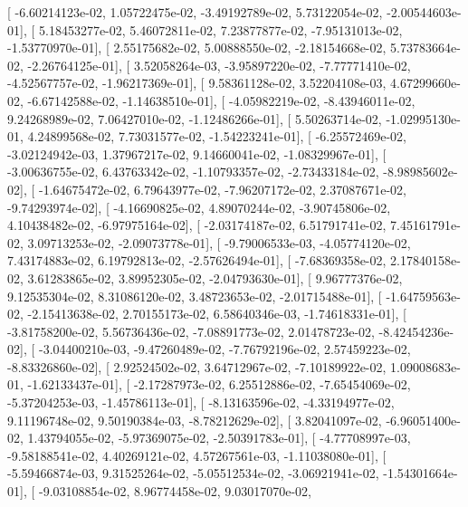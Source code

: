 \documentclass{article}
\begin{document}
       [ -6.60214123e-02,   1.05722475e-02,  -3.49192789e-02,
          5.73122054e-02,  -2.00544603e-01],
       [  5.18453277e-02,   5.46072811e-02,   7.23877877e-02,
         -7.95131013e-02,  -1.53770970e-01],
       [  2.55175682e-02,   5.00888550e-02,  -2.18154668e-02,
          5.73783664e-02,  -2.26764125e-01],
       [  3.52058264e-03,  -3.95897220e-02,  -7.77771410e-02,
         -4.52567757e-02,  -1.96217369e-01],
       [  9.58361128e-02,   3.52204108e-03,   4.67299660e-02,
         -6.67142588e-02,  -1.14638510e-01],
       [ -4.05982219e-02,  -8.43946011e-02,   9.24268989e-02,
          7.06427010e-02,  -1.12486266e-01],
       [  5.50263714e-02,  -1.02995130e-01,   4.24899568e-02,
          7.73031577e-02,  -1.54223241e-01],
       [ -6.25572469e-02,  -3.02124942e-03,   1.37967217e-02,
          9.14660041e-02,  -1.08329967e-01],
       [ -3.00636755e-02,   6.43763342e-02,  -1.10793357e-02,
         -2.73433184e-02,  -8.98985602e-02],
       [ -1.64675472e-02,   6.79643977e-02,  -7.96207172e-02,
          2.37087671e-02,  -9.74293974e-02],
       [ -4.16690825e-02,   4.89070244e-02,  -3.90745806e-02,
          4.10438482e-02,  -6.97975164e-02],
       [ -2.03174187e-02,   6.51791741e-02,   7.45161791e-02,
          3.09713253e-02,  -2.09073778e-01],
       [ -9.79006533e-03,  -4.05774120e-02,   7.43174883e-02,
          6.19792813e-02,  -2.57626494e-01],
       [ -7.68369358e-02,   2.17840158e-02,   3.61283865e-02,
          3.89952305e-02,  -2.04793630e-01],
       [  9.96777376e-02,   9.12535304e-02,   8.31086120e-02,
          3.48723653e-02,  -2.01715488e-01],
       [ -1.64759563e-02,  -2.15413638e-02,   2.70155173e-02,
          6.58640346e-03,  -1.74618331e-01],
       [ -3.81758200e-02,   5.56736436e-02,  -7.08891773e-02,
          2.01478723e-02,  -8.42454236e-02],
       [ -3.04400210e-03,  -9.47260489e-02,  -7.76792196e-02,
          2.57459223e-02,  -8.83326860e-02],
       [  2.92524502e-02,   3.64712967e-02,  -7.10189922e-02,
          1.09008683e-01,  -1.62133437e-01],
       [ -2.17287973e-02,   6.25512886e-02,  -7.65454069e-02,
         -5.37204253e-03,  -1.45786113e-01],
       [ -8.13163596e-02,  -4.33194977e-02,   9.11196748e-02,
          9.50190384e-03,  -8.78212629e-02],
       [  3.82041097e-02,  -6.96051400e-02,   1.43794055e-02,
         -5.97369075e-02,  -2.50391783e-01],
       [ -4.77708997e-03,  -9.58188541e-02,   4.40269121e-02,
          4.57267561e-03,  -1.11038080e-01],
       [ -5.59466874e-03,   9.31525264e-02,  -5.05512534e-02,
         -3.06921941e-02,  -1.54301664e-01],
       [ -9.03108854e-02,   8.96774458e-02,   9.03017070e-02,
\end{document}
